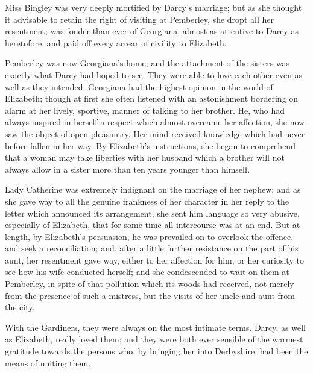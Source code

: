 Miss Bingley was very deeply mortified by Darcy's marriage; but as she thought it advisable to retain the right of visiting at Pemberley, she dropt all her resentment; was fonder than ever of Georgiana, almost as attentive to Darcy as heretofore, and paid off every arrear of civility to Elizabeth.

Pemberley was now Georgiana's home; and the attachment of the sisters was exactly what Darcy had hoped to see. They were able to love each other even as well as they intended. Georgiana had the highest opinion in the world of Elizabeth; though at first she often listened with an astonishment bordering on alarm at her lively, sportive, manner of talking to her brother. He, who had always inspired in herself a respect which almost overcame her affection, she now saw the object of open pleasantry. Her mind received knowledge which had never before fallen in her way. By Elizabeth's instructions, she began to comprehend that a woman may take liberties with her husband which a brother will not always allow in a sister more than ten years younger than himself.

Lady Catherine was extremely indignant on the marriage of her nephew; and as she gave way to all the genuine frankness of her character in her reply to the letter which announced its arrangement, she sent him language so very abusive, especially of Elizabeth, that for some time all intercourse was at an end. But at length, by Elizabeth's persuasion, he was prevailed on to overlook the offence, and seek a reconciliation; and, after a little further resistance on the part of his aunt, her resentment gave way, either to her affection for him, or her curiosity to see how his wife conducted herself; and she condescended to wait on them at Pemberley, in spite of that pollution which its woods had received, not merely from the presence of such a mistress, but the visits of her uncle and aunt from the city.

With the Gardiners, they were always on the most intimate terms. Darcy, as well as Elizabeth, really loved them; and they were both ever sensible of the warmest gratitude towards the persons who, by bringing her into Derbyshire, had been the means of uniting them.



